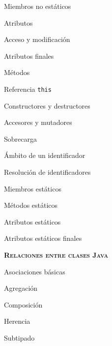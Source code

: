 \begin{longenum}
\begin{longenum}
        \item Miembros no estáticos
        \begin{longenum}
            \item Atributos
            \begin{longenum}
                \item Acceso y modificación
                \item Atributos finales
            \end{longenum}
            \item Métodos
            \begin{longenum}
                \item Referencia \texttt{this}
                \item Constructores y destructores
                \item Accesores y mutadores
                \item Sobrecarga
                \item Ámbito de un identificador
                \item Resolución de identificadores
            \end{longenum}
        \end{longenum}
        \item Miembros estáticos
        \begin{longenum}
            \item Métodos estáticos
            \item Atributos estáticos
            \item Atributos estáticos finales
        \end{longenum}
    \end{longenum}
    \item \textbf{\textsc{Relaciones entre clases Java}} \ \ \ \ \ \ \ \ \ \ \ \ \ \ \ \ \ \ \
    \begin{longenum}
        \item Asociaciones básicas
        \begin{longenum}
            \item Agregación
            \item Composición
        \end{longenum}
        \item Herencia
        \begin{longenum}
            \item Subtipado

\end{longenum}
\end{longenum}
\end{longenum}
